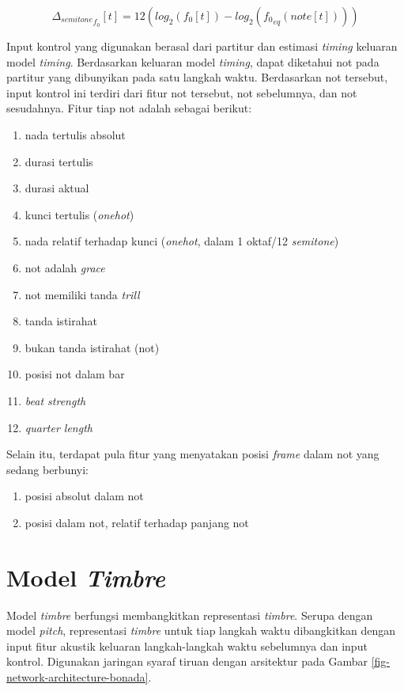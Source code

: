 \begin{equation}
    { \Delta_{semitone}}_{f_0}[t] = 12(log_2(f_0[t]) - log_2({f_0}_{eq}(note[t])))
\end{equation}\label{f0-deviation}

Input kontrol yang digunakan berasal dari partitur dan estimasi \textit{timing} keluaran model \textit{timing}. Berdasarkan keluaran model \textit{timing}, dapat diketahui not pada partitur yang dibunyikan pada satu langkah waktu. Berdasarkan not tersebut, input kontrol ini terdiri dari fitur not tersebut, not sebelumnya, dan not sesudahnya. Fitur tiap not adalah sebagai berikut:

\begin{enumerate}
  \item nada tertulis absolut 
  \item durasi tertulis
  \item durasi aktual
  \item kunci tertulis (\textit{onehot})
  \item nada relatif terhadap kunci (\textit{onehot}, dalam 1 oktaf/12 \textit{semitone})
  \item not adalah \textit{grace}
  \item not memiliki tanda \textit{trill}
  \item tanda istirahat
  \item bukan tanda istirahat (not)
  \item posisi not dalam bar
  \item \textit{beat strength}
  \item \textit{quarter length}
\end{enumerate}

Selain itu, terdapat pula fitur yang menyatakan posisi \textit{frame} dalam not yang sedang berbunyi:

\begin{enumerate}
    \item posisi absolut dalam not
    \item posisi dalam not, relatif terhadap panjang not
\end{enumerate}

\section{Model \textit{Timbre}}

Model \textit{timbre} berfungsi membangkitkan representasi \textit{timbre}. Serupa dengan model \textit{pitch}, representasi \textit{timbre} untuk tiap langkah waktu dibangkitkan dengan input fitur akustik keluaran langkah-langkah waktu sebelumnya dan input kontrol. Digunakan jaringan syaraf tiruan dengan arsitektur pada Gambar \ref{fig-network-architecture-bonada}.

